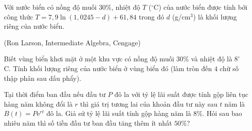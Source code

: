 \begin{ex}%
	Với nước biển có nồng độ muối $30\%$, nhiệt độ $T$ ($^\circ$C) của nước biển được tính bởi công thức $T = 7{,}9\ln (1{,}0245 - d) + 61{,}84$ trong đó $d$ (g/cm$^3$) là khối lượng  riêng của nước biển.
	\begin{flushright}
		(Ron Larson, Intermediate  Algebra, Cengage)
	\end{flushright}
	Biết vùng biển khơi mặt ở một khu vực có nồng độ muối $30\%$ và nhiệt độ là  $8^\circ$ C. Tính khối lượng riêng của nước biển ở vùng biển đó (làm tròn đến $4$ chữ số thập phân sau dấu phẩy).
\end{ex}

\begin{ex}%
	Tại thời điểm ban đầu nếu đầu tư $P$ đô la  với tỷ lệ lãi suất được tính gộp liên tục hàng năm không đổi là $r$ thì giá trị tương lai của khoản đầu tư này sau $t$ năm là $B(t)=P\mathrm{e}^{rt}$ đô la. Giả sử tỷ lệ lãi suất tính gộp hàng năm là $8\%$. Hỏi sau bao nhiêu năm thì số tiền đầu tư ban đầu tăng thêm ít nhất $50\%$?
\end{ex}

